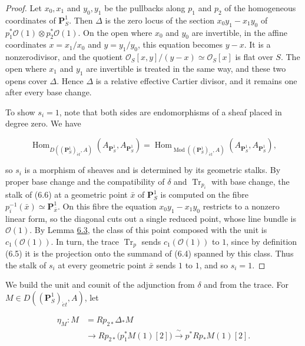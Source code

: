 \documentclass[11pt]{article}
\providecommand{\Hom}{}\renewcommand{\Hom}{\operatorname{Hom}}
\begin{document}
\begin{proof}[{Proof}]\label{bp532}%
Let \(x_0,x_1\) and \(y_0,y_1\) be the pullbacks along \(p_1\) and \(p_2\) of the homogeneous coordinates of \(\mathbf P^1_S\). Then \(\Delta\) is the zero locus of the section \(x_0y_1-x_1y_0\) of \(p_1^*\mathcal O(1)\otimes p_2^*\mathcal O(1)\). On the open where \(x_0\) and \(y_0\) are invertible, in the affine coordinates \(x=x_1/x_0\) and \(y=y_1/y_0\), this equation becomes \(y-x\). It is a nonzerodivisor, and the quotient \(\mathcal O_S[x,y]/(y-x)\simeq\mathcal O_S[x]\) is flat over \(S\). The open where \(x_1\) and \(y_1\) are invertible is treated in the same way, and these two opens cover \(\Delta\). Hence \(\Delta\) is a relative effective Cartier divisor, and it remains one after every base change.

To show \(s_i=1\), note that both sides are endomorphisms of a sheaf placed in degree zero. We have

\[
\Hom_{D((\mathbf P^1_S)_{\acute{e}t},A)}
(A_{\mathbf P^1_S},A_{\mathbf P^1_S})
=\Hom_{\operatorname{Mod}((\mathbf P^1_S)_{\acute{e}t},A)}
(A_{\mathbf P^1_S},A_{\mathbf P^1_S}),
\]

so \(s_i\) is a morphism of sheaves and is determined by its geometric stalks. By proper base change and the compatibility of \(\delta\) and \(\operatorname{Tr}_{p_i}\) with base change, the stalk of (6.6) at a geometric point \(\bar x\) of \(\mathbf P^1_S\) is computed on the fibre \(p_i^{-1}(\bar x)\simeq\mathbf P^1_{\bar x}\). On this fibre the equation \(x_0y_1-x_1y_0\) restricts to a nonzero linear form, so the diagonal cuts out a single reduced point, whose line bundle is \(\mathcal O(1)\). By Lemma \hyperref[bp523]{6.3}, the class of this point composed with the unit is \(c_1(\mathcal O(1))\). In turn, the trace \(\operatorname{Tr}_p\) sends \(c_1(\mathcal O(1))\) to \(1\), since by definition (6.5) it is the projection onto the summand of (6.4) spanned by this class. Thus the stalk of \(s_i\) at every geometric point \(\bar x\) sends \(1\) to \(1\), and so \(s_i=1\).
\end{proof}

\label{bp533}%
We build the unit and counit of the adjunction from \(\delta\) and from the trace. For \(M\in D((\mathbf P^1_S)_{\acute{e}t},A)\), let

\[
\begin{split}
\eta_M:M
&=Rp_{2*}\Delta_*M\\
&\longrightarrow Rp_{2*}\bigl(p_1^*M(1)[2]\bigr)
\xrightarrow{\ \sim\ }p^*Rp_*M(1)[2] .
\end{split}
\tag{6.7}
\]
\end{document}
